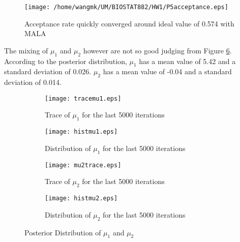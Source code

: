 \documentclass[12pt]{article}
\begin{document}
\begin{figure}[htbp]
	\centering
	\texttt{[image: /home/wangmk/UM/BIOSTAT882/HW1/P5acceptance.eps]}
	\caption{Acceptance rate quickly converged around ideal value of 0.574 with MALA}\label{p5acceptance}
\end{figure}

The mixing of $\mu_1$ and $\mu_2$ however are not so good judging from Figure \ref{p5mixing}. According to the posterior distribution, $\mu_1$ has a mean value of 5.42 and a standard deviation of 0.026. $\mu_2$ has a mean value of -0.04 and a standard deviation of 0.014.

\begin{figure}[htbp]
	\begin{subfigure}[b]{0.45\columnwidth}
		\texttt{[image: tracemu1.eps]}
		\caption{Trace of $\mu_1$ for the last 5000 iterations}
		\label{tracemu1}
	\end{subfigure}
	\hfill 
	\begin{subfigure}[b]{0.45\columnwidth}
		\texttt{[image: histmu1.eps]}
		\caption{Distribution of $\mu_1$ for the last 5000 iterations}
		\label{histmu1}
	\end{subfigure}
	\begin{subfigure}[b]{0.45\columnwidth}
		\texttt{[image: mu2trace.eps]}
		\caption{Trace of $\mu_2$ for the last 5000 iterations}
		\label{tracemu2}
	\end{subfigure}
	\hfill 
	\begin{subfigure}[b]{0.45\columnwidth}
		\texttt{[image: histmu2.eps]}
		\caption{Distribution of $\mu_2$ for the last 5000 iterations}
		\label{histmu2}
	\end{subfigure}
	
	\caption{Posterior Distribution of $\mu_1$ and $\mu_2$}\label{p5mixing}
\end{figure}
\end{document}
